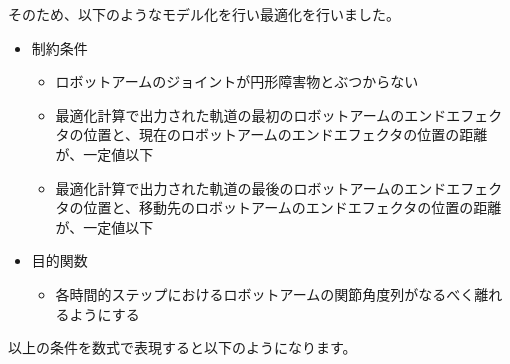 そのため、以下のようなモデル化を行い最適化を行いました。

\begin{itemize}
  \item 制約条件
  \begin{itemize}
    \item ロボットアームのジョイントが円形障害物とぶつからない
    \item 最適化計算で出力された軌道の最初のロボットアームのエンドエフェクタの位置と、現在のロボットアームのエンドエフェクタの位置の距離が、一定値以下
    \item 最適化計算で出力された軌道の最後のロボットアームのエンドエフェクタの位置と、移動先のロボットアームのエンドエフェクタの位置の距離が、一定値以下
  \end{itemize}

  \item 目的関数
    \begin{itemize}
      \item 各時間的ステップにおけるロボットアームの関節角度列がなるべく離れるようにする
    \end{itemize}
\end{itemize}

以上の条件を数式で表現すると以下のようになります。

